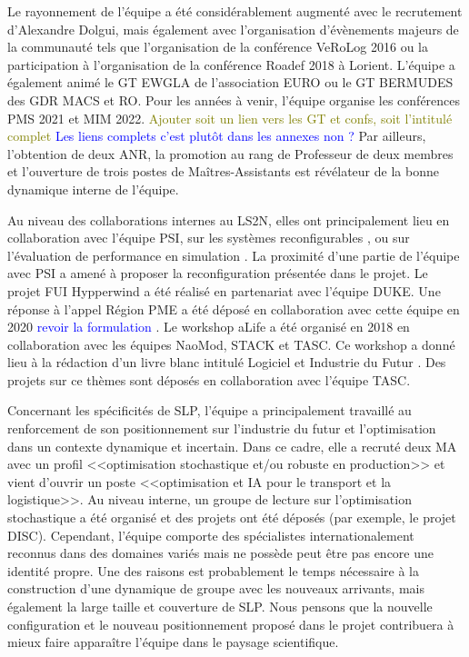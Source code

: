 Le rayonnement de l'équipe a été considérablement augmenté avec le recrutement d'Alexandre Dolgui, mais également avec l'organisation d'évènements majeurs de la communauté tels que l'organisation de la conférence VeRoLog 2016 ou la participation à l'organisation de la conférence Roadef 2018 à Lorient. 
L'équipe a également animé le GT EWGLA de l'association EURO ou le GT BERMUDES des GDR MACS et RO.
Pour les années à venir, l'équipe organise les conférences PMS 2021 et MIM 2022.
\textcolor{olive}{Ajouter soit un lien vers les GT et confs, soit l'intitulé complet}
\textcolor{blue}{Les liens complets c'est plutôt dans les annexes non ?}
Par ailleurs, l'obtention de deux ANR, la promotion au rang de Professeur de deux membres et l'ouverture de trois postes de Maîtres-Assistants est révélateur de la bonne dynamique interne de l'équipe.

Au niveau des collaborations internes au LS2N, elles ont principalement lieu en collaboration avec l'équipe PSI, sur les systèmes reconfigurables  \cite{lameche:hal-02354553, kouiss:hal-02354412}, ou sur l'évaluation de performance en simulation \cite{indriago:hal-01693153,indriago:hal-01628882}. 
La proximité d'une partie de l'équipe avec PSI a amené à proposer la reconfiguration présentée dans le projet.
Le projet FUI Hypperwind a été réalisé en partenariat avec l'équipe DUKE. Une réponse à l'appel Région PME a été déposé en collaboration avec cette équipe en 2020 \textcolor{blue}{revoir la formulation }. 
Le workshop aLife 
a été organisé en 2018 en collaboration avec les équipes NaoMod, STACK et TASC. 
Ce workshop a donné lieu à la rédaction d'un livre blanc intitulé Logiciel et Industrie du Futur \cite{bach:hal-02299214}. Des projets sur ce thèmes sont déposés en collaboration avec l'équipe TASC.

Concernant les spécificités de SLP, l'équipe a principalement travaillé au renforcement de son positionnement sur l'industrie du futur et l'optimisation dans un contexte dynamique et incertain. Dans ce cadre, elle a recruté deux MA avec un profil <<optimisation stochastique et/ou robuste en production>> et vient d'ouvrir un poste <<optimisation et IA pour le transport et la logistique>>. 
Au niveau interne, un groupe de lecture sur l'optimisation stochastique a été organisé et des projets ont été déposés (par exemple, le projet  DISC).
Cependant, l'équipe comporte des spécialistes internationalement reconnus dans des domaines variés mais ne possède peut être pas encore une identité propre. Une des raisons est probablement le temps nécessaire à la construction d'une dynamique de groupe avec les nouveaux arrivants, mais également la large taille et couverture de SLP. 
Nous pensons que la nouvelle configuration et le nouveau positionnement proposé dans le projet contribuera à mieux faire apparaître l'équipe dans le paysage scientifique. 

